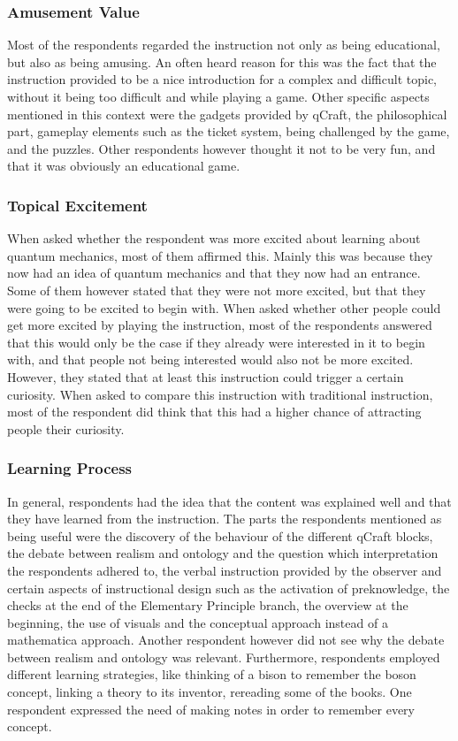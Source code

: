 \documentclass[11pt,twoside]{report} %
\begin{document}
\subsubsection{Amusement Value}

Most of the respondents regarded the instruction not only as being educational, but also as being amusing. An often heard reason for this was the fact that the instruction provided to be a nice introduction for a complex and difficult topic, without it being too difficult and while playing a game. Other specific aspects mentioned in this context were the gadgets provided by qCraft, the philosophical part, gameplay elements such as the ticket system, being challenged by the game, and the puzzles. Other respondents however thought it not to be very fun, and that it was obviously an educational game.

\subsubsection{Topical Excitement}

When asked whether the respondent was more excited about learning about quantum mechanics, most of them affirmed this. Mainly this was because they now had an idea of quantum mechanics and that they now had an entrance. Some of them however stated that they were not more excited, but that they were going to be excited to begin with. When asked whether other people could get more excited by playing the instruction, most of the respondents answered that this would only be the case if they already were interested in it to begin with, and that people not being interested would also not be more excited. However, they stated that at least this instruction could trigger a certain curiosity. When asked to compare this instruction with traditional instruction, most of the respondent did think that this had a higher chance of attracting people their curiosity.

\subsubsection{Learning Process}

In general, respondents had the idea that the content was explained well and that they have learned from the instruction. The parts the respondents mentioned as being useful were the discovery of the behaviour of the different qCraft blocks, the debate between realism and ontology and the question which interpretation the respondents adhered to, the verbal instruction provided by the observer and certain aspects of instructional design such as the activation of preknowledge, the checks at the end of the Elementary Principle branch, the overview at the beginning, the use of visuals and the conceptual approach instead of a mathematica approach. Another respondent however did not see why the debate between realism and ontology was relevant. Furthermore, respondents employed different learning strategies, like thinking of a bison to remember the boson concept, linking a theory to its inventor, rereading some of the books. One respondent expressed the need of making notes in order to remember every concept.
\end{document}
